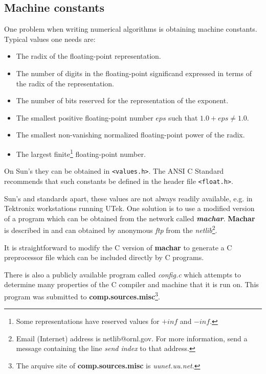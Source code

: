 \subsection{Machine constants}

One problem when writing numerical algorithms is obtaining machine
constants. Typical values one needs are:

\begin{itemize}

\item The radix of the floating-point representation.

\item The number of digits in the floating-point significand expressed
   in terms of the radix of the representation.

\item The number of bits reserved for the representation of the exponent.

\item The smallest positive floating-point number $eps$ such that $ 1.0 + eps
  \neq 1.0$.

\item The smallest non-vanishing normalized floating-point power of the radix.

\item The largest finite\footnote{Some representations have reserved values
    for $+inf$ and $-inf$.} floating-point number.

\end{itemize}

On Sun's they can be obtained in {\tt <values.h>}.
The ANSI C Standard recommends that such constants be defined in the
header file {\tt <float.h>}.

Sun's and standards apart, these values are not always readily available,
e.g. in
Tektronix workstations running UTek. One solution is to
use a modified version of a program which can be obtained from the network
called
{\em \bf machar}. {\bf Machar} is described in \cite{kn:machar} and can
obtained by anonymous {\em ftp} from the
{\em netlib}\footnote{Email (Internet) address is netlib@ornl.gov.
For more information, send a message containing the line {\em send index}
to that address.}.

It is straightforward to modify the C version of
 {\bf machar} to generate a C preprocessor
file which can be included directly by C programs.

There is also a publicly available
program called {\em config.c} which attempts to
determine many properties of the C compiler and machine that it is run on. This
program was submitted to {\bf comp.sources.misc}\footnote{The arquive site
of {\bf comp.sources.misc} is {\em uunet.uu.net}.}.


